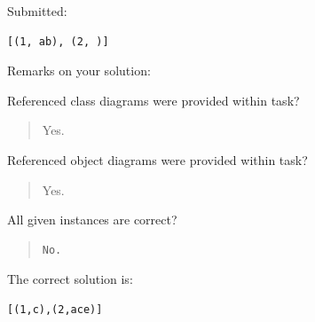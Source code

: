 Submitted:


\begin{verbatim}
[(1, ab), (2, )]
\end{verbatim}


Remarks on your solution:

Referenced class diagrams were provided within task?\begin{quote}Yes.\end{quote}Referenced object diagrams were provided within task?\begin{quote}Yes.\end{quote}All given instances are correct?

\begin{quote}
\begin{verbatim}
No.
\end{verbatim}
\end{quote}

The correct solution is:
\begin{verbatim}
[(1,c),(2,ace)]
\end{verbatim}


